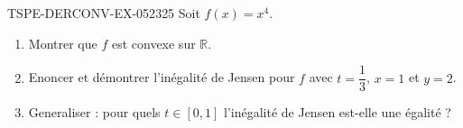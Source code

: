 \begin{exercice}{TSPE-DERCONV-EX-052}{3}{25}
Soit $f(x) = x^4$.
\begin{enumerate}
  \item Montrer que $f$ est convexe sur $\mathbb{R}$.
  \item Enoncer et démontrer l'inégalité de Jensen pour $f$ avec $t = \dfrac{1}{3}$, $x = 1$ et $y = 2$.
  \item Generaliser : pour quels $t \in [0,1]$ l'inégalité de Jensen est-elle une égalité ?
\end{enumerate}

\end{exercice}
